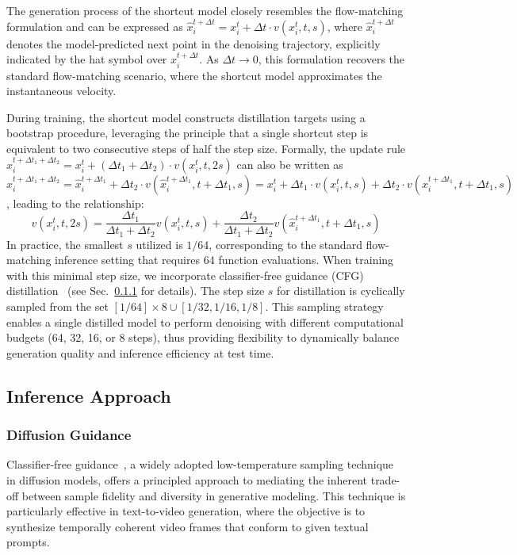 The generation process of the shortcut model closely resembles the flow-matching formulation and can be expressed as $\hat{x}_i^{t + \Delta t} = x_i^t + \Delta t \cdot v(x_i^t, t, s)$, where $\hat{x}_i^{t + \Delta t}$ denotes the model-predicted next point in the denoising trajectory, explicitly indicated by the hat symbol over ${x}_i^{t + \Delta t}$. As $\Delta t \to 0$, this formulation recovers the standard flow-matching scenario, where the shortcut model approximates the instantaneous velocity.

During training, the shortcut model constructs distillation targets using a bootstrap procedure, leveraging the principle that a single shortcut step is equivalent to two consecutive steps of half the step size. Formally, the update rule $\hat{x}_i^{t + \Delta t_1 + \Delta t_2} = x_i^t + (\Delta t_1 + \Delta t_2) \cdot v(x_i^t, t, 2s)$ can also be written as $\hat{x}_i^{t + \Delta t_1 + \Delta t_2} = \hat{x}_i^{t + \Delta t_1} + \Delta t_2 \cdot v(\hat{x}_i^{t + \Delta t_1}, t + \Delta t_1, s) = x_i^t + \Delta t_1 \cdot v(x_i^t, t, s) + \Delta t_2 \cdot v(\hat{x}_i^{t + \Delta t_1}, t + \Delta t_1, s)$, leading to the relationship:
\begin{equation} 
v(x_i^t, t, 2s) = \frac{\Delta t_1}{\Delta t_1 + \Delta t_2} v(x_i^t, t, s) + \frac{\Delta t_2}{\Delta t_1 + \Delta t_2} v(\hat{x}_i^{t + \Delta t_1}, t + \Delta t_1, s) 
\label{eq:shortcut_velocity} 
\end{equation}
In practice, the smallest $s$ utilized is $1/64$, corresponding to the standard flow-matching inference setting that requires 64 function evaluations. When training with this minimal step size, we incorporate classifier-free guidance (CFG) distillation~\citep{meng2023distillation} (see Sec.~\ref{CFG Design} for details). The step size $s$ for distillation is cyclically sampled from the set $[1/64] \times 8 \cup [1/32, 1/16, 1/8]$. This sampling strategy enables a single distilled model to perform denoising with different computational budgets (64, 32, 16, or 8 steps), thus providing flexibility to dynamically balance generation quality and inference efficiency at test time.


\subsection{Inference Approach}
\subsubsection{Diffusion Guidance}
\label{CFG Design}

Classifier-free guidance~\citep{ho2022classifier}, a widely adopted low-temperature sampling technique in diffusion models, offers a principled approach to mediating the inherent trade-off between sample fidelity and diversity in generative modeling. This technique is particularly effective in text-to-video generation, where the objective is to synthesize temporally coherent video frames that conform to given textual prompts.

